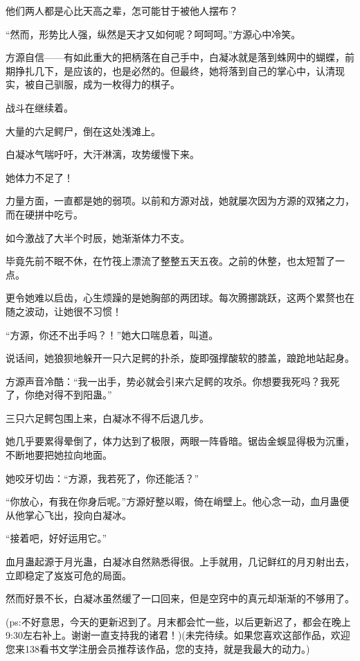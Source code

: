 \begin{this_body}
他们两人都是心比天高之辈，怎可能甘于被他人摆布？

“然而，形势比人强，纵然是天才又如何呢？呵呵呵。”方源心中冷笑。

方源自信——有如此重大的把柄落在自己手中，白凝冰就是落到蛛网中的蝴蝶，前期挣扎几下，是应该的，也是必然的。但最终，她将落到自己的掌心中，认清现实，被自己驯服，成为一枚得力的棋子。

战斗在继续着。

大量的六足鳄尸，倒在这处浅滩上。

白凝冰气喘吁吁，大汗淋漓，攻势缓慢下来。

她体力不足了！

力量方面，一直都是她的弱项。以前和方源对战，她就屡次因为方源的双猪之力，而在硬拼中吃亏。

如今激战了大半个时辰，她渐渐体力不支。

毕竟先前不眠不休，在竹筏上漂流了整整五天五夜。之前的休整，也太短暂了一点。

更令她难以启齿，心生烦躁的是她胸部的两团球。每次腾挪跳跃，这两个累赘也在随之波动，让她很不习惯！

“方源，你还不出手吗？！”她大口喘息着，叫道。

说话间，她狼狈地躲开一只六足鳄的扑杀，旋即强撑酸软的膝盖，踉跄地站起身。

方源声音冷酷：“我一出手，势必就会引来六足鳄的攻杀。你想要我死吗？我死了，你绝对得不到阳蛊。”

三只六足鳄包围上来，白凝冰不得不后退几步。

她几乎要累得晕倒了，体力达到了极限，两眼一阵昏暗。锯齿金蜈显得极为沉重，不断地要把她拉向地面。

她咬牙切齿：“方源，我若死了，你还能活？”

“你放心，有我在你身后呢。”方源好整以暇，倚在峭壁上。他心念一动，血月蛊便从他掌心飞出，投向白凝冰。

“接着吧，好好运用它。”

血月蛊起源于月光蛊，白凝冰自然熟悉得很。上手就用，几记鲜红的月刃射出去，立即稳定了岌岌可危的局面。

然而好景不长，白凝冰虽然缓了一口回来，但是空窍中的真元却渐渐的不够用了。

(ps:不好意思，今天的更新迟到了。月末都会忙一些，以后更新迟了，都会在晚上9:30左右补上。谢谢一直支持我的诸君！)(未完待续。如果您喜欢这部作品，欢迎您来138看书文学注册会员推荐该作品，您的支持，就是我最大的动力。)

\end{this_body}


